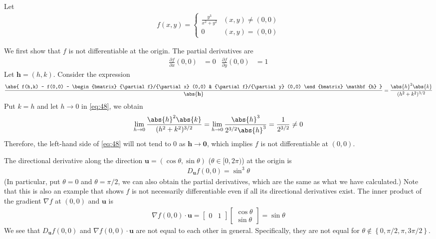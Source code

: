 \documentclass[thmcnt=section, 12pt]{elegantbook}
\begin{document}
\begin{example}
    Let 
    \begin{align*}
        f(x,y) = \begin{cases}
            \frac{y^3}{x^2 + y^2} &(x,y) \neq (0,0) \\ 
            0 &(x,y) = (0,0)
        \end{cases}
    \end{align*}

    \par We first show that $f$ is not differentiable at the origin. The partial derivatives are 
    \begin{align*}
        \frac{\partial f}{\partial x} (0,0)&= 0 &
        \frac{\partial f}{\partial y} (0,0) &= 1
    \end{align*}
    Let $\mathbf{h} = (h,k)$. Consider the expression
    \begin{align}
        \frac{\abs{
            f(h,k) - f(0,0) - \begin{bmatrix}
                {\partial f}/{\partial x} (0,0) & {\partial f}/{\partial y} (0,0)
            \end{bmatrix} \mathbf{h}
        }}{\abs{\mathbf{h}}}
        = \frac{\abs{h}^2 \abs{k}}{(h^2 + k^2)^{3/2}}
        \label{eq:48}
    \end{align}
    Put $k = h$ and let $h \to 0$ in \eqref{eq:48}, we obtain
    \begin{align*}
        \lim_{h \to 0} \frac{\abs{h}^2 \abs{k}}{(h^2 + k^2)^{3/2}}
        = \lim_{h \to 0} \frac{\abs{h}^3}{2^{3/2} \abs{h}^3}
        = \frac{1}{2^{3/2}} \neq 0
    \end{align*}
    Therefore, the left-hand side of \eqref{eq:48} will not tend to $0$ as $\mathbf{h} \to \mathbf{0}$, which implies $f$ is not differentiable at $(0,0)$.

    \par The directional derivative along the direction $\mathbf{u} = (\cos\theta, \sin\theta)$ ($\theta \in [0, 2\pi)$) at the origin is 
    \begin{align*}
        D_{\mathbf{u}}f (0,0) = \sin^3 \theta
    \end{align*}
    (In particular, put $\theta = 0$ and $\theta = \pi / 2$, we can also obtain the partial derivatives, which are the same as what we have calculated.)
    Note that this is also an example that shows $f$ is not necessarily differentiable even if all its directional derivatives exist.
    The inner product of the gradient $\nabla f$ at $(0,0)$ and $\mathbf{u}$ is 
    \begin{align*}
        \nabla f (0,0) \cdot \mathbf{u}
        = \begin{bmatrix}
            0 & 1
        \end{bmatrix} \begin{bmatrix}
            \cos\theta \\ \sin\theta
        \end{bmatrix}
        = \sin\theta
    \end{align*}
    We see that $D_{\mathbf{u}}f (0,0)$ and $\nabla f (0,0) \cdot \mathbf{u}$ are not equal to each other in general. Specifically, they are not equal for $\theta \notin \left\{0,\pi/2,\pi,3\pi/2\right\}$. 


\end{example}
\end{document}

